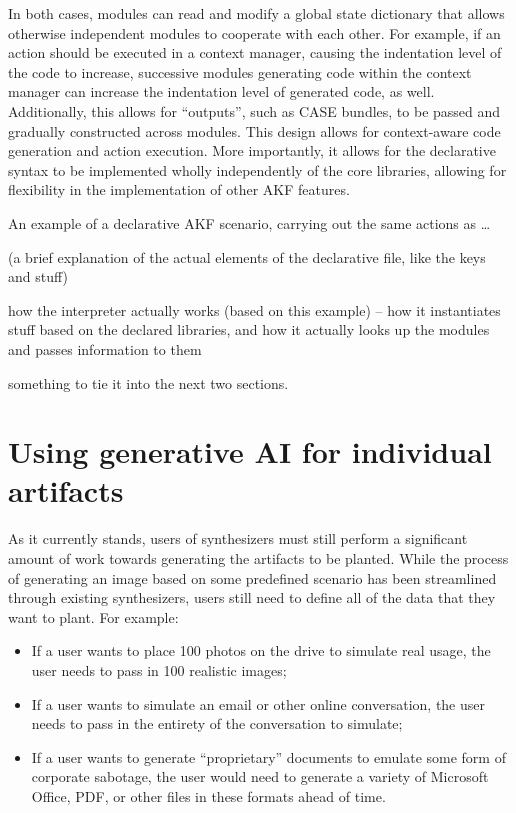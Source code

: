 In both cases, modules can read and modify a global state dictionary
that allows otherwise independent modules to cooperate with each other.
For example, if an action should be executed in a context manager,
causing the indentation level of the code to increase, successive
modules generating code within the context manager can increase the
indentation level of generated code, as well. Additionally, this allows
for ``outputs'', such as CASE bundles, to be passed and gradually
constructed across modules. This design allows for context-aware code
generation and action execution. More importantly, it allows for the
declarative syntax to be implemented wholly independently of the core
libraries, allowing for flexibility in the implementation of other AKF
features.

An example of a declarative AKF scenario, carrying out the same actions
as \ldots{}

(a brief explanation of the actual elements of the declarative file,
like the keys and stuff)

how the interpreter actually works (based on this example) -- how it
instantiates stuff based on the declared libraries, and how it actually
looks up the modules and passes information to them

something to tie it into the next two sections.

\section{Using generative AI for individual
artifacts}\label{using-generative-ai-for-individual-artifacts}

As it currently stands, users of synthesizers must still perform a
significant amount of work towards generating the artifacts to be
planted. While the process of generating an image based on some
predefined scenario has been streamlined through existing synthesizers,
users still need to define all of the data that they want to plant. For
example:

\begin{itemize}
\tightlist
\item
  If a user wants to place 100 photos on the drive to simulate real
  usage, the user needs to pass in 100 realistic images;
\item
  If a user wants to simulate an email or other online conversation, the
  user needs to pass in the entirety of the conversation to simulate;
\item
  If a user wants to generate ``proprietary'' documents to emulate some
  form of corporate sabotage, the user would need to generate a variety
  of Microsoft Office, PDF, or other files in these formats ahead of
  time.
\end{itemize}

